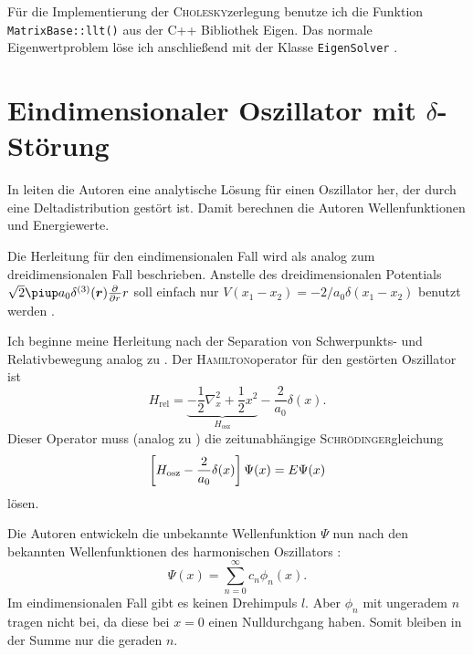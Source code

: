 Für die Implementierung der \textsc{Cholesky}zerlegung benutze ich die
Funktion \texttt{MatrixBase::llt()} \parencite{Eigen/LLT} aus der C++
Bibliothek Eigen. Das normale Eigenwertproblem löse ich anschließend mit der
Klasse \texttt{EigenSolver} \parencite{Eigen/EigenSolver}.

\section{Eindimensionaler Oszillator mit \texorpdfstring{$\delta$}{delta}-Störung}


\newcommand\br[1]{\parencite[(#1)]{Busch/Two_Cold}}

In  leiten die Autoren eine analytische Lösung für
einen Oszillator her, der durch eine Deltadistribution gestört ist. Damit
berechnen die Autoren Wellenfunktionen und Energiewerte.

Die Herleitung für den eindimensionalen Fall wird als analog zum
dreidimensionalen Fall beschrieben. Anstelle des dreidimensionalen Potentials
$\sqrt 2 \piup a_0 \delta^{(3)}(\vec r) \pd{}r r$ soll einfach nur $V(x_1 -
x_2) = - 2/a_0 \delta(x_1 - x_2)$ benutzt werden
\parencite[Fußnote~20]{Busch/Two_Cold}.

Ich beginne meine Herleitung nach der Separation von Schwerpunkts- und
Relativbewegung analog zu \br2. Der \textsc{Hamilton}operator für den
gestörten Oszillator ist
\[
    H_\text{rel} = \underbrace{- \frac12 \nabla_x^2 + \frac 12
    x^2}_{H_\text{osz}} - \frac2{a_0} \delta(x).
\]
Dieser Operator muss (analog zu \br3) die zeitunabhängige
\textsc{Schrödinger}gleichung
\begin{equation}
    \label{eq:Bus_3}
    \sbr{H_\text{osz} - \frac2{a_0} \delta(x)} \Psi(x) = E \Psi(x)
\end{equation}
lösen.

Die Autoren entwickeln die unbekannte Wellenfunktion $\Psi$ nun nach den
bekannten Wellenfunktionen des harmonischen Oszillators \br4:
\begin{equation}
    \label{eq:entwicklung}
    \Psi(x) = \sum_{n=0}^\infty c_n \phi_n(x).
\end{equation}
Im eindimensionalen Fall gibt es keinen Drehimpuls $l$. Aber $\phi_n$ mit
ungeradem $n$ tragen nicht bei, da diese bei $x = 0$ einen Nulldurchgang haben.
Somit bleiben in der Summe nur die geraden $n$.

